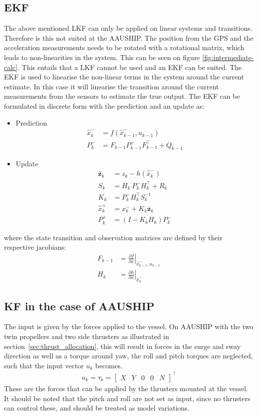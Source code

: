 \subsection{\acl{EKF}}
The above mentioned \ac{LKF} can only be applied on linear systems and transitions. Therefore is this not suited at the AAUSHIP. The position from the \ac{GPS} and the acceleration measurements needs to be rotated with a rotational matrix, which leads to non-linearities in the system. This can be seen on figure \vref{fig:intermediate-calc}. This entails that a \ac{LKF} cannot be used and an \ac{EKF} can be suited. The \ac{EKF} is used to linearise the non-linear terms in the system around the current estimate. In this case it will linearise the transition around the current measurements from the sensors to estimate the true output. The \ac{EKF} can be formulated in discrete form with the prediction and an update as:
\begin{itemize}\tightlist
\item Prediction
\begin{align}
\hat x_k^- &= f(\hat x_{k-1}^-,u_{k-1})\\
P_k^- &= F_{k-1}P_{k-1}^+F_{k-1}^\top+Q_{k-1}
\end{align}
\item Update
\begin{align}
\bar{\mathbf{z}}_k &= z_k - h(\hat x_k^-)\\
S_k &= H_k\ P_k^-H_k^\top + R_k\\
K_k &= P_k^-H_k^\top S_k^{-1}\\
\hat x_k^+ &= x_k^- + K_k \bar{\mathbf{z}}_k\\
P_k^+ &= (I - K_k H_k) P_k^-
\end{align}
\end{itemize}
where the state transition and observation matrices are defined by their respective jacobians:
\begin{align}
F_{k-1} &= \left.\frac{\partial f}{\partial x}\right|_{\hat x_{k-1}^-,u_{k-1}} \label{eq:EKFF}\\
H_k &= \left.\frac{\partial h}{\partial x}\right|_{\hat x_{k}^-}
\end{align}

\subsection{\acl{KF} in the case of AAUSHIP}
\label{sec:kfonaauship}
The input is given by the forces applied to the vessel. On AAUSHIP with the two twin propellers and two side thrusters as illustrated in section~\vref{sec:thrust_allocation}, this will result in forces in the surge and sway direction as well as a torque around yaw, the roll and pitch torques are neglected, such that the input vector $u_k$ becomes.
\begin{align}
u_k = \tau_k =
\begin{bmatrix}
X & Y & 0 & 0 & N
\end{bmatrix}^\top
\end{align}
These are the forces that can be applied by the thrusters mounted at the vessel. It should be noted that the pitch and roll are not set as input, since no thrusters can control these, and should be treated as model variations.

